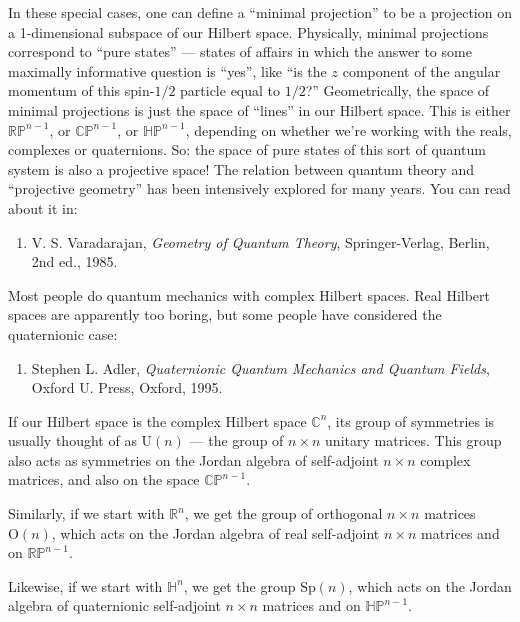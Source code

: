 \documentclass{article}
\def\tightlist{}
\begin{document}
In these special cases, one can define a ``minimal projection'' to be a
projection on a 1-dimensional subspace of our Hilbert space. Physically,
minimal projections correspond to ``pure states'' --- states of affairs
in which the answer to some maximally informative question is ``yes'',
like ``is the \(z\) component of the angular momentum of this
spin-\(1/2\) particle equal to \(1/2\)?'' Geometrically, the space of
minimal projections is just the space of ``lines'' in our Hilbert space.
This is either \(\mathbb{RP}^{n-1}\), or \(\mathbb{CP}^{n-1}\), or
\(\mathbb{HP}^{n-1}\), depending on whether we're working with the
reals, complexes or quaternions. So: the space of pure states of this
sort of quantum system is also a projective space! The relation between
quantum theory and ``projective geometry'' has been intensively explored
for many years. You can read about it in:

\begin{enumerate}
\def\labelenumi{\arabic{enumi})}
\setcounter{enumi}{3}
\tightlist
\item
  V. S. Varadarajan, \emph{Geometry of Quantum Theory}, Springer-Verlag,
  Berlin, 2nd ed., 1985.
\end{enumerate}

Most people do quantum mechanics with complex Hilbert spaces. Real
Hilbert spaces are apparently too boring, but some people have
considered the quaternionic case:

\begin{enumerate}
\def\labelenumi{\arabic{enumi})}
\setcounter{enumi}{4}
\tightlist
\item
  Stephen L. Adler, \emph{Quaternionic Quantum Mechanics and Quantum
  Fields}, Oxford U. Press, Oxford, 1995.
\end{enumerate}

If our Hilbert space is the complex Hilbert space \(\mathbb{C}^n\), its
group of symmetries is usually thought of as \(\mathrm{U}(n)\) --- the
group of \(n\times n\) unitary matrices. This group also acts as
symmetries on the Jordan algebra of self-adjoint \(n\times n\) complex
matrices, and also on the space \(\mathbb{CP}^{n-1}\).

Similarly, if we start with \(\mathbb{R}^n\), we get the group of
orthogonal \(n\times n\) matrices \(\mathrm{O}(n)\), which acts on the
Jordan algebra of real self-adjoint \(n\times n\) matrices and on
\(\mathbb{RP}^{n-1}\).

Likewise, if we start with \(\mathbb{H}^n\), we get the group
\(\mathrm{Sp}(n)\), which acts on the Jordan algebra of quaternionic
self-adjoint \(n\times n\) matrices and on \(\mathbb{HP}^{n-1}\).
\end{document}
